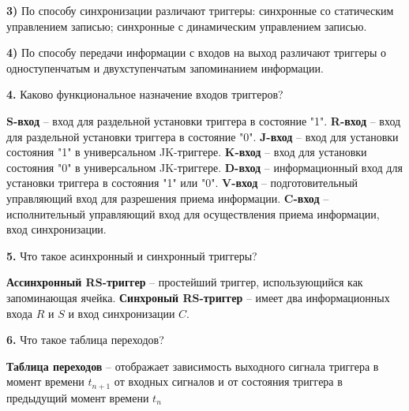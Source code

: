\documentclass[a4paper,12pt]{article}
\begin{document}
\noindent\textbf{3) }По способу синхронизации различают триггеры: синхронные со статическим управлением записью; синхронные с динамическим управлением записью. \newline

\noindent\textbf{4) }По способу передачи информации с входов на выход различают триггеры о одноступенчатым и двухступенчатым запоминанием информации.\newline

\noindent\textbf{4.} Каково функциональное назначение входов триггеров?\newline

\noindent\textbf{S-вход} -- вход для раздельной установки триггера в состояние "1".\newline
\noindent\textbf{R-вход} -- вход для раздельной установки триггера в состояние "0".\newline
\noindent\textbf{J-вход} -- вход для установки состояния "1" в универсальном JK-триггере.\newline
\noindent\textbf{K-вход} -- вход для установки состояния "0" в универсальном JK-триггере.\newline
\noindent\textbf{D-вход} -- информационный вход для установки триггера в состояния "1" или "0".\newline
\noindent\textbf{V-вход} -- подготовительный управляющий вход для разрешения приема информации.\newline
\noindent\textbf{C-вход} -- исполнительный управляющий вход для осуществления приема информации, вход синхронизации.\newline

\noindent\textbf{5.} Что такое асинхронный и синхронный триггеры?\newline

\noindent\textbf{Ассинхронный RS-триггер} -- простейший триггер, использующийся как запоминающая ячейка.\newline
\noindent\textbf{Синхроный RS-триггер} -- имеет два информационных входа $R$ и $S$ и вход синхронизации $C$.\newline

\noindent\textbf{6.} Что такое таблица переходов?\newline

\noindent\textbf{Таблица переходов} -- отображает зависимость выходного сигнала триггера в момент времени $t_{n + 1}$ от входных сигналов и от состояния триггера в предыдущий момент времени $t_{n}$\newline
\end{document}
